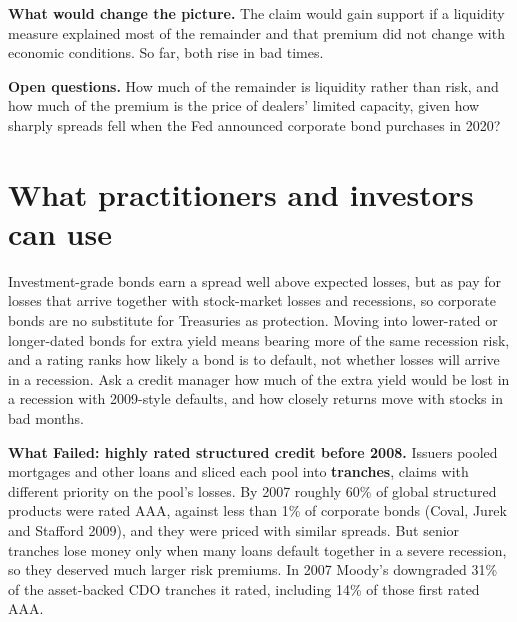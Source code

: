 \textbf{What would change the picture.} The claim would gain support if a liquidity measure explained most of the remainder and that premium did not change with economic conditions. So far, both rise in bad times.

\label{sec:15-open}
\textbf{Open questions.} How much of the remainder is liquidity rather than risk, and how much of the premium is the price of dealers' limited capacity, given how sharply spreads fell when the Fed announced corporate bond purchases in 2020?

\section{What practitioners and investors can use}
\label{sec:15-investors}

Investment-grade bonds earn a spread well above expected losses, but as pay for losses that arrive together with stock-market losses and recessions, so corporate bonds are no substitute for Treasuries as protection. Moving into lower-rated or longer-dated bonds for extra yield means bearing more of the same recession risk, and a rating ranks how likely a bond is to default, not whether losses will arrive in a recession. Ask a credit manager how much of the extra yield would be lost in a recession with 2009-style defaults, and how closely returns move with stocks in bad months.

\begin{callout}
\textbf{What Failed: highly rated structured credit before 2008.} Issuers pooled mortgages and other loans and sliced each pool into \textbf{tranches}, claims with different priority on the pool's losses. By 2007 roughly 60\% of global structured products were rated AAA, against less than 1\% of corporate bonds (Coval, Jurek and Stafford 2009), and they were priced with similar spreads. But senior tranches lose money only when many loans default together in a severe recession, so they deserved much larger risk premiums. In 2007 Moody's downgraded 31\% of the asset-backed CDO tranches it rated, including 14\% of those first rated AAA.
\end{callout}

\makeatletter
{}
\makeatother

